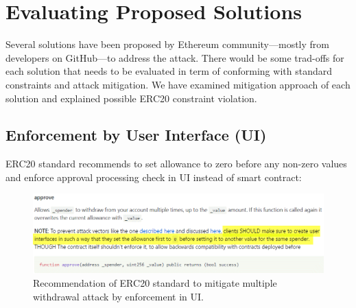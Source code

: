 
\section{Evaluating Proposed Solutions}

Several solutions have been proposed by Ethereum community---mostly from developers on GitHub\cite{Ref07}---to address the attack. There would be some trad-offs for each solution that needs to be evaluated in term of conforming with standard constraints and attack mitigation. We have examined mitigation approach of each solution and explained possible ERC20 constraint violation.

\subsection{Enforcement by User Interface (UI)}
ERC20 standard recommends to set allowance to zero before any non-zero values and enforce approval processing check in UI instead of smart contract:
\begin{figure}[t!]
	\centering
	\includegraphics[width=1.0\linewidth]{figures/multiple_withdrawal_03.png}
	\caption{Recommendation of ERC20 standard to mitigate multiple withdrawal attack by enforcement in UI.}
\end{figure}


